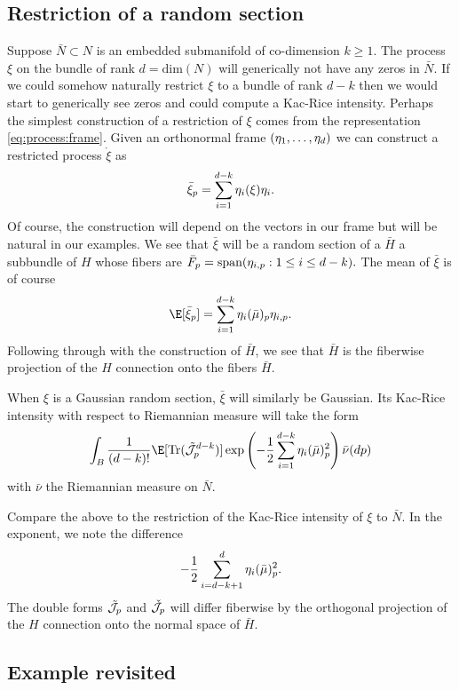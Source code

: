\documentclass{article}
\newcommand{\randsec}{\xi}
\newcommand{\linprocess}{\mathring{\randsec}}
\newcommand{\meansec}{\bar{\mu}}
\begin{document}
\begin{eqaution}
\subsection{Restriction of a random section}

Suppose $\bar{N} \subset N$ is an embedded submanifold of co-dimension $k \geq 1$. The process $\randsec$ on the bundle of rank
$d=\text{dim}(N)$ will generically not have any zeros in $\bar{N}$. If we could somehow naturally restrict
$\randsec$ to a bundle of rank $d-k$ then we would start to generically see zeros and could compute a
Kac-Rice intensity. Perhaps the simplest construction of a restriction of $\randsec$ comes from the representation
\eqref{eq:process:frame}. Given an orthonormal frame $(\eta_1, \dots, \eta_d)$ we can construct a restricted process
$\linprocess$ as
$$
\bar{\randsec}_p = \sum_{i=1}^{d-k} \ONF_i(\randsec) \ONF_i.
$$
Of course, the construction will depend on the vectors in our frame but will be natural in our examples. We see that
$\bar{\randsec}$ will be a random section of a $\bar{H}$ a subbundle of $H$ whose fibers are 
$\bar{F}_p = \text{span}(\eta_{i,p}:1 \leq i \leq d-k).$ The mean of $\bar{\randsec}$ is of course
$$
\E[\bar{\randsec}_p] = \sum_{i=1}^{d-k} \ONF_i(\meansec)_p \ONF_{i,p}.
$$
Following through with the construction of  $\bar{H}$, we see that
$\bar{H}$ is the fiberwise projection of the $H$ connection onto the fibers $\bar{H}$.

When $\randsec$ is a Gaussian random section, $\bar{\randsec}$ will similarly be Gaussian. Its Kac-Rice
intensity with respect to Riemannian measure will take the form
\begin{equation}
  \label{eq:kac:rice:restriction}
\int_B \frac{1}{(d-k)!}\E[ \text{Tr}(\tilde{\cal J}_p^{d-k})] \exp\left(-\frac{1}{2} \sum_{i=1}^{d-k} \ONF_i(\meansec)_p^2\right) \bar{\nu}(dp)
\end{equation}
with $\bar{\nu}$ the Riemannian measure on $\bar{N}$.

Compare the above to the restriction of the Kac-Rice intensity of $\randsec$ to $\bar{N}$. In the exponent,
we note the difference
$$
-\frac{1}{2}\sum_{i=d-k+1}^d \ONF_i(\meansec)_p^2.
$$
The double forms $\tilde{\cal J}_p$ and $\check{\cal J}_p$ will differ fiberwise by the orthogonal projection of the
$H$ connection onto the normal space of $\bar{H}$.

\subsection{Example revisited}


\end{eqaution}
\end{document}
